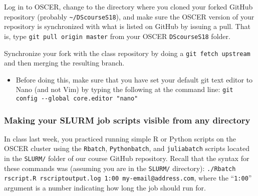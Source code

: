 \documentclass[12pt,english]{exam}
\begin{document}
\begin{questions}
\question Log in to OSCER, change to the directory where you cloned your forked GitHub repository (probably \texttt{\textasciitilde/DScourseS18}), and make sure the OSCER version of your repository is synchronized with what is listed on GitHub by issuing a pull. That is, type \texttt{git pull origin master} from your OSCER \texttt{DScourseS18} folder. 

\question Synchronize your fork with the class repository by doing a \texttt{git fetch upstream} and then merging the resulting branch. 
\begin{itemize}
	\item Before doing this, make sure that you have set your default git text editor to Nano (and not Vim) by typing the following at the command line: \texttt{git config -{}-global core.editor "nano"}
\end{itemize}

\subsubsection*{Making your SLURM job scripts visible from any directory}

\question In class last week, you practiced running simple R or Python scripts on the OSCER cluster using the \texttt{Rbatch}, \texttt{Pythonbatch}, and \texttt{juliabatch} scripts located in the \texttt{SLURM/} folder of our course GitHub repository. Recall that the syntax for these commands was (assuming you are in the \texttt{SLURM/} directory): \texttt{./Rbatch rscript.R rscriptoutput.log 1:00 my-email@address.com}, where the ``\texttt{1:00}'' argument is a number indicating how long the job should run for.


\end{questions}
\end{document}
